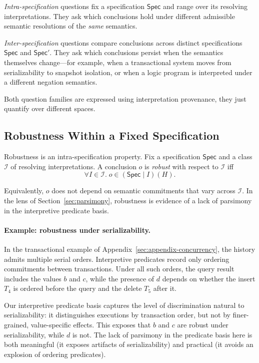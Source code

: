 \documentclass[acmsmall,nonacm]{acmart}
\theoremstyle{remark}
\numberwithin{definition}{section}
\numberwithin{theorem}{section}
\numberwithin{lemma}{section}
\numberwithin{corollary}{section}
\numberwithin{remark}{section}
\numberwithin{example}{section}
\numberwithin{observation}{section}
\numberwithin{assumption}{section}
\newcommand{\Spec}{\mathsf{Spec}}
\begin{document}
\emph{Intra-specification} questions fix a specification $\Spec$ and range over its
resolving interpretations.
They ask which conclusions hold under different admissible semantic resolutions
of the \emph{same} semantics.

\emph{Inter-specification} questions compare conclusions across distinct
specifications $\Spec$ and $\Spec'$.
They ask which conclusions persist when the semantics themselves change—for
example, when a transactional system moves from serializability to snapshot
isolation, or when a logic program is interpreted under a different negation
semantics.

Both question families are expressed using interpretation provenance, they
just quantify over different spaces.

\subsection{Robustness Within a Fixed Specification}

Robustness is an intra-specification property.
Fix a specification $\Spec$ and a class $\mathcal{I}$ of resolving interpretations.
A conclusion $o$ is \emph{robust} with respect to $\mathcal{I}$ iff
\[
  \forall I \in \mathcal{I}.\; o \in (\Spec \mid I)(H).
\]

Equivalently, $o$ does not depend on semantic commitments that vary across
$\mathcal{I}$.
In the lens of Section~\ref{sec:parsimony}, robustness is evidence of a lack of
parsimony in the interpretive predicate basis.

\paragraph{Example: robustness under serializability.}
In the transactional example of
Appendix~\ref{sec:appendix-concurrency}, the history admits multiple serial orders.
Interpretive predicates record only ordering commitments between transactions.
Under all such orders, the query result includes the values $b$ and $c$, while the
presence of $d$ depends on whether the insert $T_4$ is ordered before the query
and the delete $T_5$ after it.

Our interpretive predicate basis captures the level of discrimination natural to
serializability: it distinguishes executions by transaction order, but not by
finer-grained, value-specific effects.
This exposes that $b$ and $c$ are robust under serializability, while $d$ is not.
The lack of parsimony in the predicate basis here is both meaningful (it exposes artifacts of serializability)
and practical (it avoids an explosion of ordering predicates).
\end{document}
